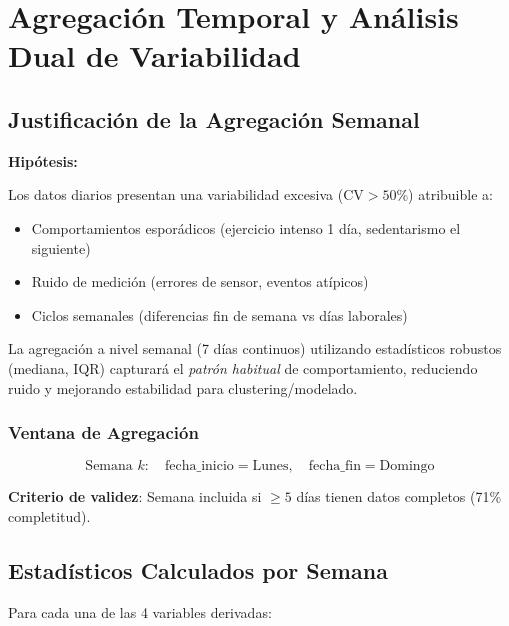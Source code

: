 \documentclass[12pt,letterpaper,twoside]{report}
\begin{document}
\chapter{Agregación Temporal y Análisis Dual de Variabilidad}

\section{Justificación de la Agregación Semanal}

\begin{hipotesisbox}
\textbf{Hipótesis:}

Los datos diarios presentan una variabilidad excesiva ($\text{CV} > 50\%$) atribuible a:
\begin{itemize}[noitemsep]
    \item Comportamientos esporádicos (ejercicio intenso 1 día, sedentarismo el siguiente)
    \item Ruido de medición (errores de sensor, eventos atípicos)
    \item Ciclos semanales (diferencias fin de semana vs días laborales)
\end{itemize}

La agregación a nivel semanal (7 días continuos) utilizando estadísticos robustos (mediana, IQR) capturará el \textit{patrón habitual} de comportamiento, reduciendo ruido y mejorando estabilidad para clustering/modelado.
\end{hipotesisbox}

\subsection{Ventana de Agregación}

\begin{equation}
\text{Semana } k: \quad \text{fecha\_inicio} = \text{Lunes}, \quad \text{fecha\_fin} = \text{Domingo}
\end{equation}

\textbf{Criterio de validez}: Semana incluida si $\geq 5$ días tienen datos completos (71\% completitud).

\section{Estadísticos Calculados por Semana}

Para cada una de las 4 variables derivadas:
\end{document}
